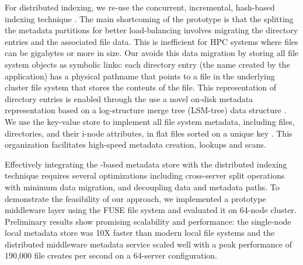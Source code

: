For distributed indexing, we re-use the concurrent, incremental, hash-based
\giga{} indexing technique \citep{giga}.
The main shortcoming of the \giga{} prototype is that the splitting
the metadata partitions for better load-balancing involves migrating the
directory entries and the associated file data\citep{giga}.
This is inefficient for HPC systems where files can be gigabytes or more in
size. Our \giga{} avoids this data migration by storing all file
system objects as symbolic links: each directory entry (the name created by the
application) has a physical pathname that points to a file in the underlying
cluster file system that stores the contents of the file.
This representation of directory entries is enabled through the use a novel
on-disk metadata representation based on a log-structure merge tree (LSM-tree)
data structure \citep{ONeil1996}.
We use the \ldb{} key-value store to implement all file system metadata, including 
files, directories, and their i-node attributes, in flat files sorted on a
unique key \citep{LevelDB}.
This organization facilitates high-speed metadata creation, lookups and scans.

Effectively integrating the \ldb-based metadata store with the distributed indexing
technique requires several optimizations including cross-server split operations 
with minimum data migration, and decoupling data and metadata paths.
To demonstrate the feasibility of our approach, we implemented a prototype middleware layer
using the FUSE file system and evaluated it on 64-node cluster. Preliminary
results show promising scalability and performance: the single-node local metadata 
store was 10X faster than modern local file systems and the distributed
middleware metadata service scaled well with a peak performance of 190,000 file creates per second 
on a 64-server configuration. 


